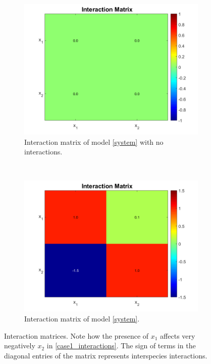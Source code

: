 \documentclass[3p,times]{article}
\begin{document}
\begin{figure}[h]
	\centering
	\begin{subfigure}[b]{0.45\textwidth}
		\includegraphics[width = \textwidth]{Stability/Interactions_case_study_1_no_interactions}
		\caption{Interaction matrix of model \eqref{system} with no interactions.}
		\label{case1_no_interactions}
	\end{subfigure}
	~
	\begin{subfigure}[b]{0.45\textwidth}
		\includegraphics[width = \textwidth]{Stability/Interactions_case_study_1}
		\caption{Interaction matrix of model \eqref{system}.}
		\label{case1_interactions}
	\end{subfigure}
	\caption{Interaction matrices. Note how the presence of $x_1$ affects very negatively $x_2$ in \eqref{case1_interactions}. The sign of terms in the diagonal entries of the matrix represents interspecies interactions.}
\end{figure} 
\end{document}
